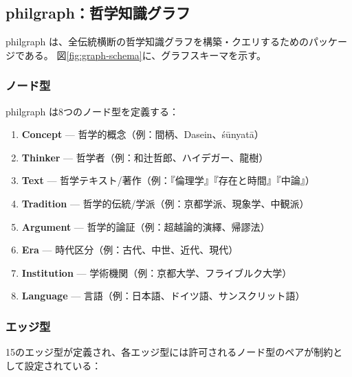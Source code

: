\documentclass[a4paper,11pt]{ltjsarticle}
\begin{document}
\subsection{philgraph：哲学知識グラフ}

philgraph は、全伝統横断の哲学知識グラフを構築・クエリするためのパッケージである。
図\ref{fig:graph-schema}に、グラフスキーマを示す。

\subsubsection{ノード型}

philgraph は8つのノード型を定義する：

\begin{enumerate}[leftmargin=2em]
  \item \textbf{Concept} --- 哲学的概念（例：間柄、Dasein、śūnyatā）
  \item \textbf{Thinker} --- 哲学者（例：和辻哲郎、ハイデガー、龍樹）
  \item \textbf{Text} --- 哲学テキスト/著作（例：『倫理学』『存在と時間』『中論』）
  \item \textbf{Tradition} --- 哲学的伝統/学派（例：京都学派、現象学、中観派）
  \item \textbf{Argument} --- 哲学的論証（例：超越論的演繹、帰謬法）
  \item \textbf{Era} --- 時代区分（例：古代、中世、近代、現代）
  \item \textbf{Institution} --- 学術機関（例：京都大学、フライブルク大学）
  \item \textbf{Language} --- 言語（例：日本語、ドイツ語、サンスクリット語）
\end{enumerate}

\subsubsection{エッジ型}

15のエッジ型が定義され、各エッジ型には許可されるノード型のペアが制約として設定されている：
\end{document}
